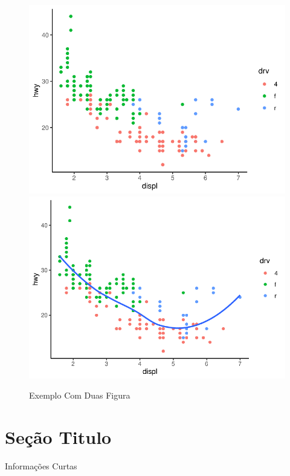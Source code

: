 \begin{figure}[h]
	\caption{Exemplo Com Duas Figura}
	\includegraphics[width=\linewidth]{fig/plot}
	\includegraphics[width=\linewidth]{fig/plot2}
\end{figure}

\section{Seção Titulo}

\lipsum[1-2]

\begin{smbox}{Informações Curtas}
	\lipsum[1]
\end{smbox}

